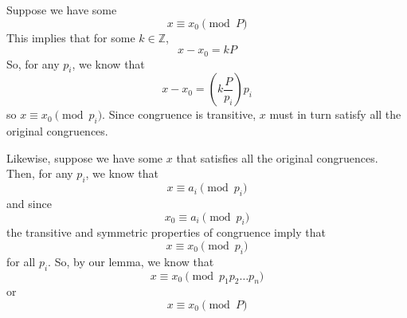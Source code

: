 \documentclass{article}
\begin{document}
Suppose we have some
$$x \equiv x_0 \pmod{P}$$
This implies that for some $k \in \mathbb{Z}$,
$$x - x_0 = kP$$
So, for any $p_i$, we know that
$$x - x_0 = \left ( k\frac{P}{p_i} \right ) p_i$$
so $x \equiv x_0 \pmod{p_i}$.  Since congruence is transitive, $x$ must in turn satisfy all the original congruences.

Likewise, suppose we have some $x$ that satisfies all the original congruences.  Then, for any $p_i$, we know that
$$x \equiv a_i \pmod{p_i}$$
and since
$$x_0 \equiv a_i \pmod{p_i}$$
the transitive and symmetric properties of congruence imply that
$$x \equiv x_0 \pmod{p_i}$$
for all $p_i$.  So, by our lemma, we know that
$$x \equiv x_0 \pmod{p_1 p_2 \dots p_n}$$
or
$$x \equiv x_0 \pmod{P}$$
\end{document}
